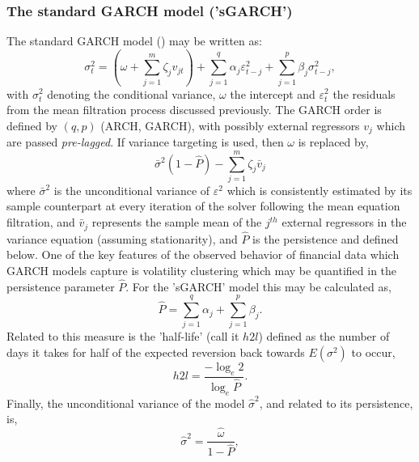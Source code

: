 \subsubsection{The standard GARCH model ('sGARCH')}\label{section:sgarch}
The standard GARCH model (\citet{Bollerslev1}) may be written as:
\begin{equation}\label{eq:sgarch}
\sigma _t^2 = \left( {\omega  + \sum\limits_{j = 1}^m {{\zeta _j}{v_{jt}}} } \right) + \sum\limits_{j = 1}^q {{\alpha _j}\varepsilon _{t - j}^2 + } \sum\limits_{j = 1}^p {{\beta _j}\sigma _{t - j}^2},
\end{equation}
with $\sigma_t^2$ denoting the conditional variance, $\omega$ the intercept
and $\varepsilon_t^2$ the residuals from the mean filtration process discussed
previously. The GARCH order is defined by $(q, p)$ (ARCH, GARCH), with possibly
\verb@m@ external regressors $v_j$ which are passed \emph{pre-lagged}.
If variance targeting is used, then $\omega$ is replaced by,
\begin{equation}\label{eq:sgarchvt}
{{\bar \sigma }^2}\left( {1 - \hat P} \right) - \sum\limits_{j = 1}^m {{\zeta _j}{{\bar v}_j}}
\end{equation}
where ${\bar \sigma}^2$ is the unconditional variance of $\varepsilon^2$ which
is consistently estimated by its sample counterpart at every iteration of the
solver following the mean equation filtration, and ${\bar v}_j$ represents the
sample mean of the $j^{th}$ external regressors in the variance equation
(assuming stationarity), and $\hat P$ is the persistence and defined below.
One of the key features of the observed behavior of financial data which GARCH
models capture is volatility clustering which may be quantified in the
persistence parameter $\hat P$. For the 'sGARCH' model this may be calculated as,
\begin{equation}\label{eq:sgarchp}
\hat P = \sum\limits_{j = 1}^q {{\alpha _j}}  + \sum\limits_{j = 1}^p {{\beta _j}}.
\end{equation}
Related to this measure is the 'half-life' (call it $h2l$) defined as the number
of days it takes for half of the expected reversion back
towards $E\left( {{\sigma ^2}} \right)$ to occur,
\begin{equation}\label{eq:sgarchh2l}
h2l = \frac{{ - {{\log }_e}2}}{{{{\log }_e}\hat P}}.
\end{equation}
Finally, the unconditional variance of the model ${\hat \sigma }^2$, and related
to its persistence, is,
\begin{equation}\label{eq:sgarchuncv}
{{\hat \sigma }^2} = \frac{{\hat \omega }}{{1 - \hat P}},
\end{equation}
